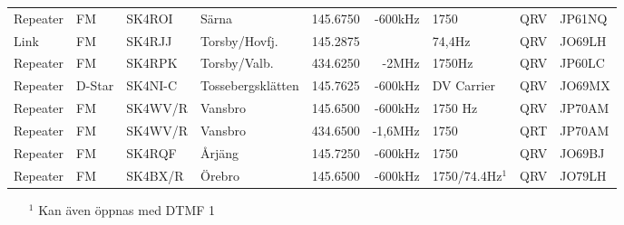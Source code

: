 \begin{landscape}
\begin{longtable}{llllrrlcl}
	Repeater           & FM           & SK4ROI        & Särna               &          145.6750 &        -600kHz & 1750            &       QRV       & JP61NQ           \\
	Link               & FM           & SK4RJJ        & Torsby/Hovfj.       &          145.2875 &                & 74,4Hz          &       QRV       & JO69LH           \\
	Repeater           & FM           & SK4RPK        & Torsby/Valb.        &          434.6250 &          -2MHz & 1750Hz          &       QRV       & JP60LC           \\
	Repeater           & D-Star       & SK4NI-C       & Tossebergsklätten   &          145.7625 &        -600kHz & DV Carrier      &       QRV       & JO69MX           \\
	Repeater           & FM           & SK4WV/R       & Vansbro             &          145.6500 &        -600kHz & 1750 Hz         &       QRV       & JP70AM           \\
	Repeater           & FM           & SK4WV/R       & Vansbro             &          434.6500 &        -1,6MHz & 1750            &       QRT       & JP70AM           \\
	Repeater           & FM           & SK4RQF        & Årjäng              &          145.7250 &        -600kHz & 1750            &       QRV       & JO69BJ           \\
	Repeater           & FM           & SK4BX/R       & Örebro              &          145.6500 &        -600kHz & 1750/74.4Hz$^1$ &       QRV       & JO79LH
\end{longtable}
\begin{itemize}
\item[$^1$] Kan även öppnas med DTMF 1
\end{itemize}

\end{landscape}
